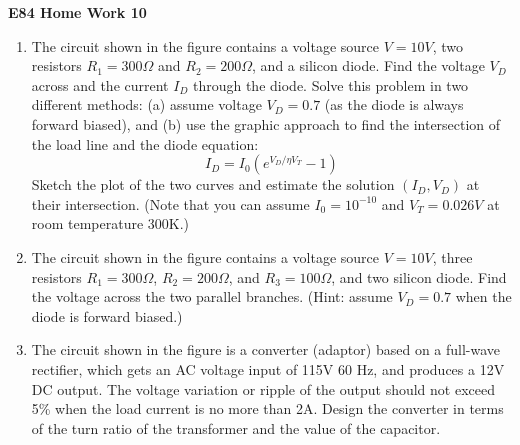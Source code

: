 \usepackage{html}

\begin{center}
{\Large \bf  E84 Home Work 10}
\end{center}
\begin{enumerate}


\item The circuit shown in the figure contains a voltage source $V=10V$,
two resistors $R_1=300\Omega$ and $R_2=200\Omega$, and a silicon diode.
Find the voltage $V_D$ across and the current $I_D$ through the diode.
Solve this problem in two different methods: (a) assume voltage $V_D=0.7$ 
(as the diode is always forward biased), and (b) use the graphic approach
to find the intersection of the load line and the diode equation:
\[ I_D=I_0 ( e^{V_D/\eta V_T}-1 ) \]
Sketch the plot of the two curves and estimate the solution $(I_D,V_D)$
at their intersection. (Note that you can assume $I_0=10^{-10}$ and 
$V_T=0.026V$ at room temperature 300K.)



\item The circuit shown in the figure contains a voltage source $V=10V$,
three resistors $R_1=300\Omega$, $R_2=200\Omega$, and $R_3=100\Omega$, 
and two silicon diode. Find the voltage across the two parallel branches.
(Hint: assume $V_D=0.7$ when the diode is forward biased.)



\item The circuit shown in the figure is a converter (adaptor) based on
a full-wave rectifier, which gets an AC voltage input of 115V 60 Hz, and
produces a 12V DC output. The voltage variation or ripple of the output
should not exceed 5\% when the load current is no more than 2A. Design 
the converter in terms of the turn ratio of the transformer and the 
value of the capacitor. 


\end{enumerate}
